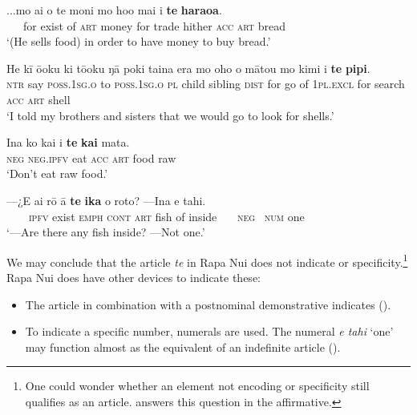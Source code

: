 \ea\label{ex:5.34}
\gll ...mo ai o te moni mo ho{\ꞌ}o mai i \textbf{te} \textbf{haraoa}. \\
~~~for exist of \textsc{art} money for trade hither \textsc{acc} \textsc{art} bread \\

\glt 
‘(He sells food) in order to have money to buy bread.’ \textstyleExampleref{[R156.023]} 
\z

\ea\label{ex:5.35}
\gll He kī ō{\ꞌ}oku ki tō{\ꞌ}oku ŋā poki taina era mo oho o mātou mo kimi i \textbf{te} \textbf{pipi}.\\
\textsc{ntr} say \textsc{poss.1sg.o} to \textsc{poss.1sg.o} \textsc{pl} child sibling \textsc{dist} for go of \textsc{1pl.excl} for search \textsc{acc} \textsc{art} shell\\

\glt 
‘I told my brothers and sisters that we would go to look for shells.’ \textstyleExampleref{[R125.002]} 
\z

\ea\label{ex:5.36}
\gll {\ꞌ}Ina ko kai i \textbf{te} \textbf{kai} mata. \\
\textsc{neg} \textsc{neg.ipfv} eat \textsc{acc} \textsc{art} food raw \\

\glt 
‘Don’t eat raw food.’  
\z

\ea\label{ex:5.37}
\gll —¿E ai rō {\ꞌ}ā \textbf{te} \textbf{ika} o roto? —{\ꞌ}Ina e tahi. \\
~~~~\textsc{ipfv} exist \textsc{emph} \textsc{cont} \textsc{art} fish of inside ~~~\textsc{neg~} \textsc{num} one \\

\glt
‘—Are there any fish inside? —Not one.’ \textstyleExampleref{[R241.058]} 
\z

We may conclude that the article \textit{te} in Rapa Nui does not indicate  or specificity.\footnote{\label{fn:252}One could wonder whether an element not encoding  or specificity still qualifies as an article. \citet[157]{Dryer2007Noun} answers this question in the affirmative.} Rapa Nui does have other devices to indicate these:

\begin{itemize}
\item 
The article in combination with a postnominal demonstrative indicates  (). 

\item 
To indicate a specific number, numerals are used. The numeral \textit{e tahi} ‘one’ may function almost as the equivalent of an indefinite article ().

\end{itemize}

